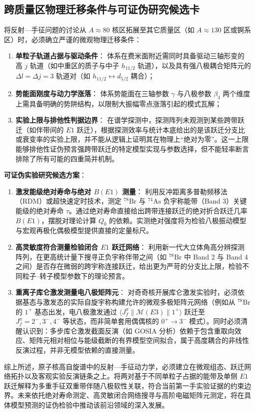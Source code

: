\subsection{跨质量区物理迁移条件与可证伪研究候选卡}\label{sec:4-5-6}

将反射---手征问题的讨论从 $A \approx 80$ 核区拓展至其它质量区（如 $A \approx 130$ 区或锕系区）时，必须确立严谨的微观物理迁移条件：
\begin{enumerate}
\item \textbf{单粒子轨道占据与驱动条件}：
体系在费米面附近需同时具备驱动三轴形变的高 $j$ 轨道（如中重区的质子与中子 $h_{11/2}$ 轨道），以及具有强八极耦合矩阵元的 $\Delta l = \Delta j = 3$ 轨道对（如 $h_{11/2} \leftrightarrow d_{5/2}$ 耦合）；
\item \textbf{势能面刚度与动力学涨落}：
体系势能面在三轴参数 $\gamma$ 与八极参数 $\beta_3$ 两个维度上需具备明确的势阱结构，以限制大振幅零点涨落引起的模式瓦解；
\item \textbf{实验上限与排他性判据边界}：
在谱学探测中，探测阵列未观测到某些跨带跃迁（如伴带间的 $E1$ 跃迁），根据探测效率与统计本底给出的是该跃迁分支比或衰变率的实验上限，并不能从逻辑上证明其在物理上“绝对为零”。这一上限能够排他性证伪预言强跨带跃迁的特定模型实现与参数选择，但不能轻率断言排除了所有可能的四重简并机制。
\end{enumerate}

\textbf{可证伪实验研究候选方案}：
\begin{enumerate}
\item \textbf{激发能级绝对寿命与绝对 $B(E1)$ 测量}：
利用反冲距离多普勒频移法（RDM）或超快速定时技术，测定 $^{78}\mathrm{Br}$ 与 $^{74}\mathrm{As}$ 负宇称能带（Band 3）关键能级的绝对寿命 $\tau$。通过绝对寿命直接给出跨带连接跃迁的绝对折合跃迁几率 $B(E1)$，摆脱对理论计算 $Q_0$ 的依赖。实测绝对强度将为检验八极振动模型与宏观再极化偶极模型提供直接的定量标尺。
\item \textbf{高灵敏度符合测量检验闭合 $E1$ 跃迁网络}：
利用新一代大立体角高分辨探测阵列，在更高统计量下搜寻正负宇称伴带之间（如 $^{78}\mathrm{Br}$ 中 Band 2 与 Band 4 之间）是否存在微弱的跨宇称连接跃迁，给出更为严苛的分支比上限，检验不同粒子--转子模型参数下的理论预言。
\item \textbf{重离子库仑激发测量电八极矩阵元}：
对奇奇核开展库仑激发实验时，必须依据基态与激发态的实际自旋宇称构建允许的微观多极矩阵元网络（例如从 $^{78}\mathrm{Br}$ 的 $1^+$ 基态出发，电八极激发通过 $\langle J_f^\pi \| \mathcal{M}(E3) \| 1^+ \rangle$ 跃迁至 $J_f^\pi = 2^-, 3^-, 4^-$ 等状态，而非简单套用偶偶核的 $0^+ \to 3^-$ 模式）。同时必须清醒认识到：多步库仑激发截面反演（如 GOSIA 分析）依赖于包含重取向效应、矩阵元相对相位与能级截断的有界模型空间拟合，属于高度耦合的非线性反演过程，并非无模型依赖的直接测量。
\end{enumerate}

综上所述，原子核高自旋谱中的反射---手征动力学，必须建立在微观组态、跃迁网络拓扑以及客观实验反演链条之上。将两对基于不同单粒子占据的能带及单侧 $E1$ 跃迁解释为多重手征双重带伴随八极软性关联，符合当前第一手实验证据的约束边界。未来依托绝对寿命测定、高灵敏闭合网络搜寻与高阶电磁矩阵元测定，将在具体模型预测的证伪检验中推动该前沿领域的深入发展。
